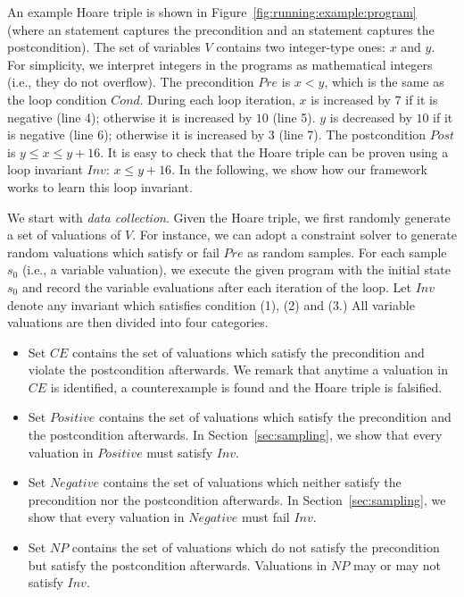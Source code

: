 \begin{example}
An example Hoare triple is shown in Figure~\ref{fig:running:example:program} (where an  statement captures the precondition and an  statement captures the postcondition). The set of variables $V$ contains two integer-type ones: $x$ and $y$. For simplicity, we interpret integers in the programs as mathematical integers (i.e., they do not overflow). The precondition $Pre$ is $x < y$, which is the same as the loop condition $Cond$.
During each loop iteration, $x$ is increased by $7$ if it is negative (line 4); otherwise it is increased by $10$ (line 5). $y$ is decreased by $10$ if it is negative (line 6); otherwise it is increased by $3$ (line 7). The postcondition $Post$ is $y \le x \le y + 16$. It is easy to check that the Hoare triple can be proven using a loop invariant $Inv$: $x \le y + 16$. In the following, we show how our framework works to learn this loop invariant.
\end{example}
We start with \emph{data collection}. Given the Hoare triple, we first randomly generate a set of valuations of $V$. For instance, we can adopt a constraint solver to generate random valuations which satisfy or fail $Pre$ as random samples. For each sample $s_0$ (i.e., a variable valuation), we execute the given program with the initial state $s_0$ and record the variable evaluations after each iteration of the loop. %
Let $Inv$ denote any invariant which satisfies condition (1), (2) and (3.) All variable valuations are then divided into four categories.
\begin{itemize}
    \item Set $\mathit{CE}$ contains the set of valuations which satisfy the precondition and violate the postcondition afterwards. We remark that anytime a valuation in $\mathit{CE}$ is identified, a counterexample is found and the Hoare triple is falsified.
    \item Set $\mathit{Positive}$ contains the set of valuations which satisfy the precondition and the postcondition afterwards. In Section~\ref{sec:sampling}, we show that every valuation in $\mathit{Positive}$ must satisfy $Inv$.
    \item Set $\mathit{Negative}$ contains the set of valuations which neither satisfy the precondition nor the postcondition afterwards. In Section~\ref{sec:sampling}, we show that every valuation in $\mathit{Negative}$ must fail $Inv$.
    \item Set $\mathit{NP}$ contains the set of valuations which do not satisfy the precondition but satisfy the postcondition afterwards. Valuations in $\mathit{NP}$ may or may not satisfy $Inv$.
\end{itemize}
